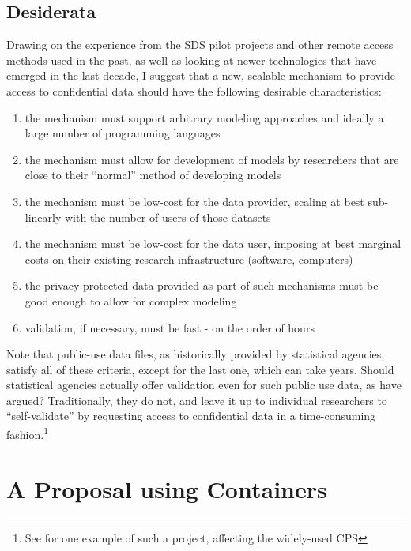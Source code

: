 \documentclass[12pt]{article}
\begin{document}
\subsection{Desiderata}
\label{sec:desiderata}

Drawing on the experience from the SDS pilot projects and other remote access methods used in the past, as well as looking at newer technologies that have emerged in the last decade, I suggest that a new, scalable mechanism to provide access to confidential data should have the following desirable characteristics:

\begin{enumerate}
    \item the mechanism must support arbitrary modeling approaches and ideally a large number of programming languages
    \item the mechanism must allow for development of models by researchers that are close to their ``normal'' method of developing models
    \item the mechanism must be low-cost for the data provider, scaling at best sub-linearly with the number of users of those datasets
    \item the mechanism must be low-cost for the data user, imposing at best marginal costs on their existing research infrastructure (software, computers)
    \item the privacy-protected data provided as part of such mechanisms must be good enough to allow for complex modeling
    \item validation, if necessary, must be fast - on the order of hours
\end{enumerate}

Note that public-use data files, as historically provided by statistical agencies, satisfy all of these criteria, except for the last one, which can take years. Should statistical agencies actually offer validation even for such public use data, as \citet{reiter_verification_2009} have argued? Traditionally, they do not, and leave it up to individual researchers to ``self-validate'' by requesting access to confidential data in a time-consuming fashion.\footnote{See \cite{armour_using_2016} for one example of such a project, affecting the widely-used \ac{CPS}}

\section{A Proposal using Containers}
\label{sec:proposal}
\end{document}
